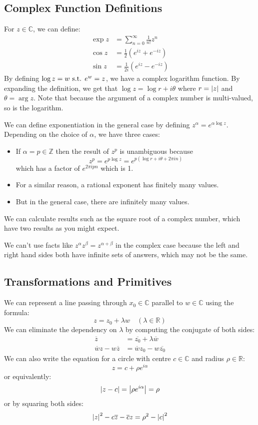 \subsection{Complex Function Definitions}
For \(z \in \mathbb C\), we can define:
\begin{align*}
	\exp z & = \sum_{n=0}^{\infty} \frac{1}{n!}z^n          \\
	\cos z & = \frac{1}{2} \left( e^{iz} + e^{-iz} \right)  \\
	\sin z & = \frac{1}{2i} \left( e^{iz} - e^{-iz} \right)
\end{align*}
By defining \(\log z = w \text{ s.t. } e^w = z\), we have a complex logarithm function.
By expanding the definition, we get that \(\log z = \log r + i\theta\) where \(r = \abs{z}\) and \(\theta = \arg{z}\).
Note that because the argument of a complex number is multi-valued, so is the logarithm.

We can define exponentiation in the general case by defining \(z^\alpha = e^{\alpha \log z}\).
Depending on the choice of \(\alpha\), we have three cases:
\begin{itemize}
	\item If \(\alpha = p \in \mathbb Z\) then the result of \(z^p\) is unambiguous because
	      \[
		      z^p = e^{p \log z} = e^{p (\log r + i \theta + 2 \pi i n)}
	      \]
	      which has a factor of \(e^{2 \pi i p n}\) which is 1.
	\item For a similar reason, a rational exponent has finitely many values.
	\item But in the general case, there are infinitely many values.
\end{itemize}
We can calculate results such as the square root of a complex number, which have two results as you might expect.

\begin{note}
	We can't use facts like \(z^\alpha z^\beta = z^{\alpha + \beta}\) in the complex case because the left and right hand sides both have infinite sets of answers, which may not be the same.
\end{note}

\subsection{Transformations and Primitives}
We can represent a line passing through \(x_0\in \mathbb C\) parallel to \(w \in \mathbb C\) using the formula:
\[
	z = z_0 + \lambda w\quad(\lambda \in \mathbb R)
\]
We can eliminate the dependency on \(\lambda\) by computing the conjugate of both sides:
\begin{align*}
	\overline{z}                  & = \overline{z_0} + \lambda \overline{w} \\
	\overline{w}z - w\overline{z} & = \overline{w}z_0 - w\overline{z_0}
\end{align*} %
We can also write the equation for a circle with centre \(c \in \mathbb C\) and radius \(\rho \in \mathbb R\):
\[
	z = c + \rho e^{i\alpha}
\]
or equivalently:
\[
	\abs{z - c} = \abs{\rho e^{i\alpha}} = \rho
\]
or by squaring both sides:
\[
	\abs{z}^2 - c\overline{z} - \overline{c}z = \rho^2 - \abs{c}^2
\]
